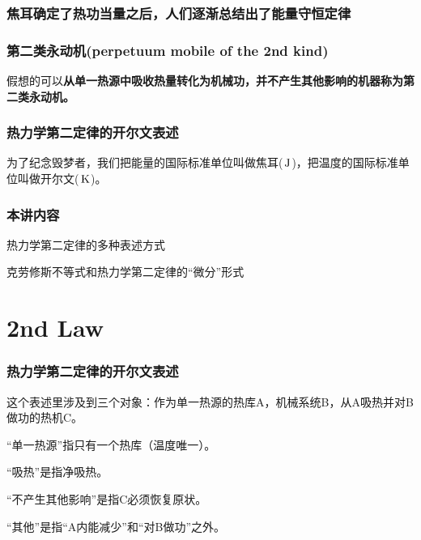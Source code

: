 \documentclass[CJK, 14pt]{beamer}
\begin{document}
\begin{frame}
  
  \frametitle{{\bf 焦耳确定了热功当量}之后，人们逐渐总结出了{\bf 能量守恒定律}}
  
  
\end{frame}

\begin{frame}
  \frametitle{第二类永动机(perpetuum mobile of the 2nd kind)}

  假想的可以{\bf 从单一热源中吸收热量转化为机械功，并不产生其他影响的机器称为第二类永动机。}




 

\end{frame}


\begin{frame}

\frametitle{热力学第二定律的开尔文表述}




\end{frame}



\begin{frame}

为了纪念毁梦者，我们把能量的国际标准单位叫做焦耳($\,\mathrm{J}$)，把温度的国际标准单位叫做开尔文($\,\mathrm{K}$)。
\end{frame}

\begin{frame}
\frametitle{本讲内容}
\bitem
\item{热力学第二定律的多种表述方式}
\item{克劳修斯不等式和热力学第二定律的“微分”形式}
\eitem
\end{frame}

\section{2nd Law}

\begin{frame}
\frametitle{热力学第二定律的开尔文表述}


  这个表述里涉及到三个对象：作为单一热源的热库A，机械系统B，从A吸热并对B做功的热机C。
  
\bitem
\item{“单一热源”指只有一个热库（温度唯一）。}
\item{“吸热”是指净吸热。}
\item{“不产生其他影响”是指C必须恢复原状。}
  \eitem

{\scriptsize “其他”是指“A内能减少”和“对B做功”之外}。  


  
\end{frame}
\end{document}
